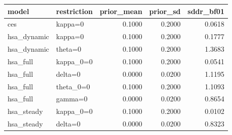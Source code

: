 \begin{tabular}{llrrr}
\toprule
model & restriction & prior\_mean & prior\_sd & sddr\_bf01 \\
\midrule
ces & kappa=0 & 0.1000 & 0.2000 & 0.0618 \\
hsa\_dynamic & kappa=0 & 0.1000 & 0.2000 & 0.1777 \\
hsa\_dynamic & theta=0 & 0.1000 & 0.2000 & 1.3683 \\
hsa\_full & kappa\_0=0 & 0.1000 & 0.2000 & 0.0541 \\
hsa\_full & delta=0 & 0.0000 & 0.0200 & 1.1195 \\
hsa\_full & theta\_0=0 & 0.1000 & 0.2000 & 1.1093 \\
hsa\_full & gamma=0 & 0.0000 & 0.0200 & 0.8654 \\
hsa\_steady & kappa\_0=0 & 0.1000 & 0.2000 & 0.0102 \\
hsa\_steady & delta=0 & 0.0000 & 0.0200 & 0.8323 \\
\bottomrule
\end{tabular}
